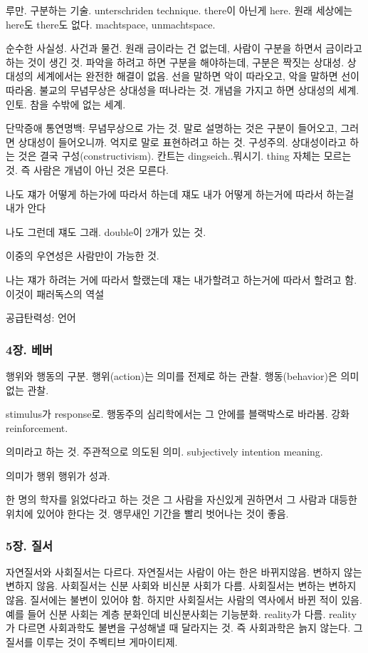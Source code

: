 \documentclass[12pt, a4paper]{article}
\begin{document}
루만. 구분하는 기술. unterschriden technique. there이 아닌게 here. 원래 세상에는 here도 there도 없다. machtspace, unmachtspace. 

순수한 사실성. 사건과 물건. 원래 금이라는 건 없는데, 사람이 구분을 하면서 금이라고 하는 것이 생긴 것. 파악을 하려고 하면 구분을 해야하는데, 구분은 짝짓는 상대성. 상대성의 세계에서는 완전한 해결이 없음. 선을 말하면 악이 따라오고, 악을 말하면 선이 따라옴. 불교의 무념무상은 상대성을 떠나라는 것. 개념을 가지고 하면 상대성의 세계. 인토. 참을 수밖에 없는 세계.

단막증애 통연명백: 무념무상으로 가는 것. 말로 설명하는 것은 구분이 들어오고, 그러면 상대성이 들어오니까. 억지로 말로 표현하려고 하는 것. 구성주의. 상대성이라고 하는 것은 결국 구성(constructivism). 칸트는 dingseich..뭐시기. thing 자체는 모르는 것. 즉 사람은 개념이 아닌 것은 모른다.

나도 쟤가 어떻게 하는가에 따라서 하는데 쟤도 내가 어떻게 하는거에 따라서 하는걸 내가 안다

나도 그런데 쟤도 그래. double이 2개가 있는 것.

이중의 우연성은 사람만이 가능한 것. 

나는 쟤가 하려는 거에 따라서 할랬는데 쟤는 내가할려고 하는거에 따라서 할려고 함. 이것이 패러독스의 역설

공급탄력성: 언어

\subsubsection{4장. 베버}

행위와 행동의 구분. 행위(action)는 의미를 전제로 하는 관찰. 행동(behavior)은 의미 없는 관찰.

stimulus가 response로. 행동주의 심리학에서는 그 안에를 블랙박스로 바라봄. 강화 reinforcement. 

의미라고 하는 것. 주관적으로 의도된 의미. subjectively intention meaning. 

의미가 행위 행위가 성과.

한 명의 학자를 읽었다라고 하는 것은 그 사람을 자신있게 권하면서 그 사람과 대등한 위치에 있어야 한다는 것. 앵무새인 기간을 빨리 벗어나는 것이 좋음. 




\subsubsection{5장. 질서}
자연질서와 사회질서는 다르다. 자연질서는 사람이 아는 한은 바뀌지않음. 변하지 않는 변하지 않음. 사회질서는 신분 사회와 비신분 사회가 다름. 사회질서는 변하는 변하지 않음. 질서에는 불변이 있어야 함. 하지만 사회질서는 사람의 역사에서 바뀐 적이 있음. 예를 들어 신분 사회는 계층 분화인데 비신분사회는 기능분화. reality가 다름. reality가 다르면 사회과학도 불변을 구성해낼 때 달라지는 것. 즉 사회과학은 늙지 않는다. 그 질서를 이루는 것이 주벡티브 게마이티제.
\end{document}
